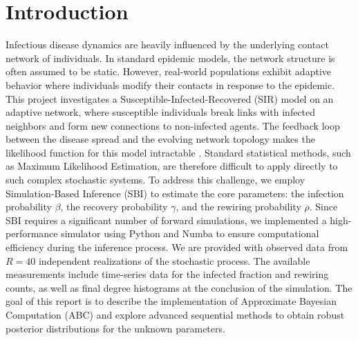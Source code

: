 \section{Introduction}
Infectious disease dynamics are heavily influenced by the underlying contact network of individuals.
In standard epidemic models, the network structure is often assumed to be static.
However, real-world populations exhibit adaptive behavior where individuals modify their contacts in response to the epidemic.
This project investigates a Susceptible-Infected-Recovered (SIR) model on an adaptive network, where susceptible individuals break links with infected neighbors and form new connections to non-infected agents.
The feedback loop between the disease spread and the evolving network topology makes the likelihood function for this model intractable \parencite{demirel2017dynamics}.
Standard statistical methods, such as Maximum Likelihood Estimation, are therefore difficult to apply directly to such complex stochastic systems.
To address this challenge, we employ Simulation-Based Inference (SBI) to estimate the core parameters: the infection probability $\beta$, the recovery probability $\gamma$, and the rewiring probability $\rho$.
Since SBI requires a significant number of forward simulations, we implemented a high-performance simulator using Python and Numba to ensure computational efficiency during the inference process.
We are provided with observed data from $R=40$ independent realizations of the stochastic process.
The available measurements include time-series data for the infected fraction and rewiring counts, as well as final degree histograms at the conclusion of the simulation.
The goal of this report is to describe the implementation of Approximate Bayesian Computation (ABC) and explore advanced sequential methods to obtain robust posterior distributions for the unknown parameters.